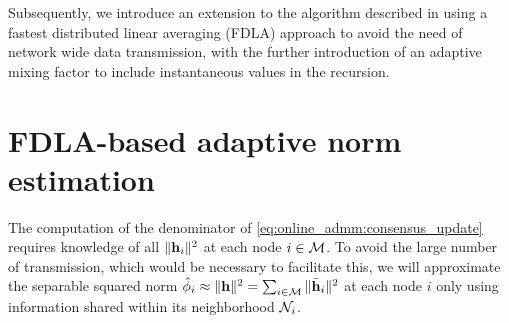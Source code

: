 \documentclass{article}
\begin{document}
Subsequently, we introduce an extension to the algorithm described in \cite{blochbergerDBSI} using a fastest distributed linear averaging (FDLA) approach \cite{xiaoFastLinearIterations2004} to avoid the need of network wide data transmission, with the further introduction of an adaptive mixing factor to include instantaneous values in the recursion.

\section{FDLA-based adaptive norm estimation}
\label{sec:adaptivenormest}

The computation of the denominator of \eqref{eq:online_admm:consensus_update} requires knowledge of all \(\|\bm{\mathrm{h}}_i\|^2\) at each node \(i \in \mathcal{M}\).
To avoid the large number of transmission, which would be necessary to facilitate this, we will approximate the separable squared norm \(\hat{\phi}_i \approx \|\bm{\mathrm{h}}\|^2= \sum_{i \in \mathcal{M}} \|\bar{\bm{\mathrm{h}}}_i\|^2\) at each node \(i\) only using information shared within its neighborhood \(\mathcal{N}_i\).
\end{document}
